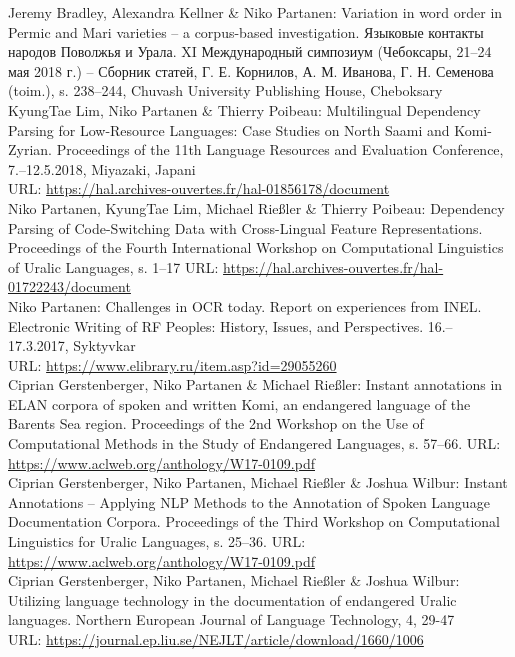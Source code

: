 \documentclass[11pt, a4paper]{article}
\newcommand{\years}[1]{\marginnote{\scriptsize #1}} %
\begin{document}
\years{2018} Jeremy Bradley, Alexandra Kellner \& Niko Partanen: Variation in word order in Permic and Mari varieties – a corpus-based investigation. Языковые контакты народов Поволжья и Урала. XI Международный симпозиум (Чебоксары, 21–24 мая 2018 г.) – Сборник статей, Г. Е. Корнилов, А. М. Иванова, Г. Н. Семенова (toim.), s. 238–244, Chuvash University Publishing House, Cheboksary\\

\years{2018} KyungTae Lim, Niko Partanen \& Thierry Poibeau: Multilingual Dependency Parsing for Low-Resource Languages: Case Studies on North Saami and Komi-Zyrian. Proceedings of the 11th Language Resources and Evaluation Conference, 7.--12.5.2018, Miyazaki, Japani
\\URL: \url{https://hal.archives-ouvertes.fr/hal-01856178/document}\\

\years{2018} Niko Partanen, KyungTae Lim, Michael Rießler \& Thierry Poibeau: Dependency Parsing of Code-Switching Data with Cross-Lingual Feature Representations. Proceedings of the Fourth International Workshop on Computational Linguistics of Uralic Languages, s. 1--17
URL: \url{https://hal.archives-ouvertes.fr/hal-01722243/document}\\

\years{2017} Niko Partanen: Challenges in OCR today. Report on experiences from INEL. Electronic Writing of RF Peoples: History, Issues, and Perspectives. 16.--17.3.2017, Syktyvkar
\\URL: \url{https://www.elibrary.ru/item.asp?id=29055260}\\

\years{2017} Ciprian Gerstenberger, Niko Partanen \& Michael Rießler: Instant annotations in ELAN corpora of spoken and written Komi, an endangered language of the Barents Sea region. Proceedings of the 2nd Workshop on the Use of Computational Methods in the Study of Endangered Languages, s. 57--66.
URL: \url{https://www.aclweb.org/anthology/W17-0109.pdf}\\

\years{2017} Ciprian Gerstenberger, Niko Partanen, Michael Rießler \& Joshua Wilbur: Instant Annotations -- Applying NLP Methods to the Annotation of Spoken Language Documentation Corpora. Proceedings of the Third Workshop on Computational Linguistics for Uralic Languages, s. 25--36.
URL: \url{https://www.aclweb.org/anthology/W17-0109.pdf}\\

\years{2016} Ciprian Gerstenberger, Niko Partanen, Michael Rießler \& Joshua Wilbur: Utilizing language technology in the documentation of endangered Uralic languages. Northern European Journal of Language Technology, 4, 29-47 \\
URL: \url{https://journal.ep.liu.se/NEJLT/article/download/1660/1006}\\
\end{document}
